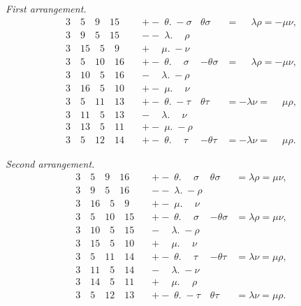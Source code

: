\documentclass[11pt,a4paper,english]{article}
\theoremstyle{plain}
\begin{document}
\textit{First arrangement.}
\begin{align*}
3\quad 5\quad 9\quad 15\quad &+ -\; \theta.\; -\sigma & \theta\sigma &= \phantom{-}\lambda\rho = -\mu\nu, \\
3\quad 9\quad 5\quad 15\quad &--\; \lambda.\phantom{-}\rho & & \\
3\quad 15\quad 5\quad 9\quad &+\phantom{-}\mu.\; -\nu & & \\[4pt]
3\quad 5\quad 10\quad 16\quad &+ -\; \theta.\phantom{-}\sigma & -\theta\sigma &= \phantom{-}\lambda\rho = -\mu\nu, \\
3\quad 10\quad 5\quad 16\quad &-\phantom{-}\lambda.\; -\rho & & \\
3\quad 16\quad 5\quad 10\quad &+ -\; \mu.\phantom{-}\nu & & \\[4pt]
3\quad 5\quad 11\quad 13\quad &+ -\; \theta.\; -\tau & \theta\tau &= -\lambda\nu = \phantom{-}\mu\rho, \\
3\quad 11\quad 5\quad 13\quad &-\phantom{-}\lambda.\phantom{-}\nu & & \\
3\quad 13\quad 5\quad 11\quad &+ -\; \mu.\; -\rho & & \\[4pt]
3\quad 5\quad 12\quad 14\quad &+ -\; \theta.\phantom{-}\tau & -\theta\tau &= -\lambda\nu = \phantom{-}\mu\rho.
\end{align*}

\textit{Second arrangement.}
\begin{align*}
3\quad 5\quad 9\quad 16\quad &+ -\; \theta.\phantom{-}\sigma & \theta\sigma &= \lambda\rho = \mu\nu, \\
3\quad 9\quad 5\quad 16\quad &--\; \lambda.\; -\rho & & \\
3\quad 16\quad 5\quad 9\quad &+ -\; \mu.\phantom{-}\nu & & \\[4pt]
3\quad 5\quad 10\quad 15\quad &+ -\; \theta.\phantom{-}\sigma & -\theta\sigma &= \lambda\rho = \mu\nu, \\
3\quad 10\quad 5\quad 15\quad &-\phantom{-}\lambda.\; -\rho & & \\
3\quad 15\quad 5\quad 10\quad &+\phantom{-}\mu.\phantom{-}\nu & & \\[4pt]
3\quad 5\quad 11\quad 14\quad &+ -\; \theta.\phantom{-}\tau & -\theta\tau &= \lambda\nu = \mu\rho, \\
3\quad 11\quad 5\quad 14\quad &-\phantom{-}\lambda.\; -\nu & & \\
3\quad 14\quad 5\quad 11\quad &+\phantom{-}\mu.\phantom{-}\rho & & \\[4pt]
3\quad 5\quad 12\quad 13\quad &+ -\; \theta.\; -\tau & \theta\tau &= \lambda\nu = \mu\rho.
\end{align*}
\end{document}
